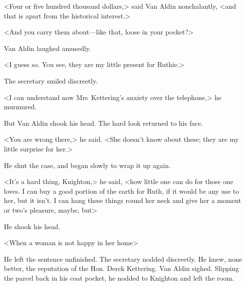 <Four or five hundred thousand dollars,> said Van Aldin nonchalantly, <and that is apart from the historical interest.>

<And you carry them about—like that, loose in your pocket?>

Van Aldin laughed amusedly.

<I guess so. You see, they are my little present for Ruthie.>

The secretary smiled discreetly.

<I can understand now Mrs~Kettering's anxiety over the telephone,> he murmured.

But Van Aldin shook his head. The hard look returned to his face.

<You are wrong there,> he said. <She doesn't know about these; they are my little surprise for her.>

He shut the case, and began slowly to wrap it up again.

<It's a hard thing, Knighton,> he said, <how little one can do for those one loves. I can buy a good portion of the earth for Ruth, if it would be any use to her, but it isn't. I can hang these things round her neck and give her a moment or two's pleasure, maybe, but\longdash>

He shook his head.

<When a woman is not happy in her home\longdash>

He left the sentence unfinished. The secretary nodded discreetly. He knew, none better, the reputation of the Hon. Derek Kettering. Van Aldin sighed. Slipping the parcel back in his coat pocket, he nodded to Knighton and left the room.